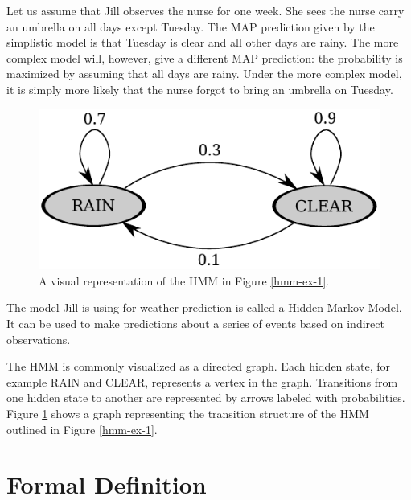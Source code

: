 Let us assume that Jill observes the nurse for one week. She sees the
nurse carry an umbrella on all days except Tuesday. The MAP prediction
given by the simplistic model is that Tuesday is clear and all other
days are rainy. The more complex model will, however, give a different
MAP prediction: the probability is maximized by assuming that all days
are rainy. Under the more complex model, it is simply more likely that
the nurse forgot to bring an umbrella on Tuesday.

\begin{figure}[!htb]
\begin{center}
\includegraphics[scale=0.8]{hmm-ex-graph}
\caption{A visual representation of the HMM in Figure \ref{hmm-ex-1}.}\label{hmm-ex-2}
\end{center}
\end{figure}

The model Jill is using for weather prediction is called a Hidden
Markov Model. It can be used to make predictions about a series of
events based on indirect observations. 

The HMM is commonly visualized as a directed graph. Each hidden state,
for example RAIN and CLEAR, represents a vertex in the
graph. Transitions from one hidden state to another are represented by
arrows labeled with probabilities. Figure \ref{hmm-ex-2} shows a graph
representing the transition structure of the HMM outlined in Figure
\ref{hmm-ex-1}.

\section{Formal Definition}


